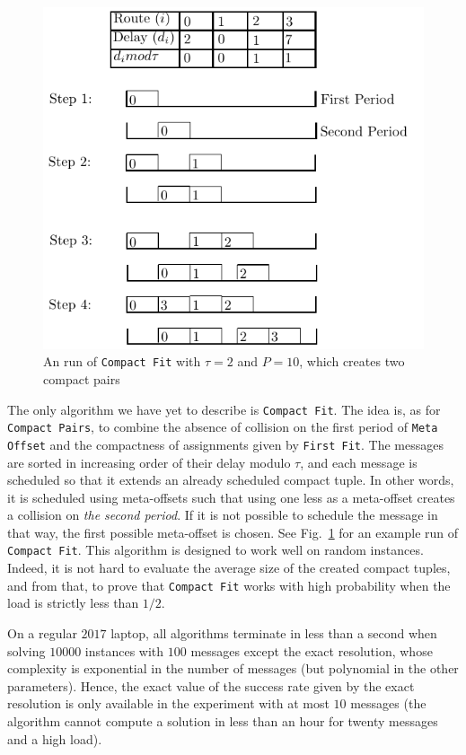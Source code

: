 \documentclass[a4paper,UKenglish,cleveref, autoref, thm-restate]{lipics-v2019}
\newcommand\firstfit{\texttt{First Fit}\xspace}
\newcommand\compactpair{\texttt{Compact Pairs}\xspace}
\newcommand\metaoffset{\texttt{Meta Offset}\xspace}
\newcommand\compactfit{\texttt{Compact Fit}\xspace}
\begin{document}
\begin{figure}[h]
 \begin{center}
\includegraphics[scale=1]{compactfit}
\end{center}
\caption{An run of \compactfit with $\tau = 2$ and $P=10$, which creates two compact pairs}
\label{fig:compactfit}
\end{figure}

The only algorithm we have yet to describe is \compactfit. The idea is, as for \compactpair, to combine the absence of collision on the first period of \metaoffset and the compactness of assignments given by \firstfit.
The messages are sorted in increasing order of their delay modulo $\tau$, and each message is scheduled so that it extends an already scheduled compact tuple. 
In other words, it is scheduled using meta-offsets such that using one less as a meta-offset creates a collision on \emph{the second period}. If it is not possible to schedule the message in that way, the first possible meta-offset is chosen. See Fig.~\ref{fig:compactfit} for an example run of \compactfit. This algorithm is designed to work well on random instances. Indeed, it is not hard to evaluate the average size of the created compact tuples, and from that, to prove that \compactfit works with high probability when the load is strictly less than $1/2$.


On a regular $2017$ laptop, all algorithms terminate in less than a second when solving $10000$ instances with $100$ messages except the exact resolution, whose complexity is exponential in the number of messages (but polynomial in the other parameters). Hence, the exact value of the success rate given by the exact resolution is only available in the experiment with at most $10$ messages (the algorithm cannot compute a solution in less than an hour for twenty messages and a high load). 
\end{document}
